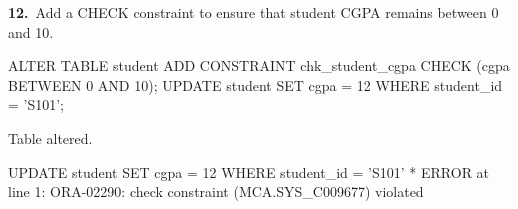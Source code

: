 
\noindent\begin{minipage}{\linewidth}
\begingroup{}
{\fontsize{14}{17}\selectfont\textbf{12.}}\ Add a CHECK constraint to ensure that student CGPA remains between 0 and 10.\par
\endgroup\vspace{12pt}


\begin{sqlcode}
ALTER TABLE student
    ADD CONSTRAINT chk_student_cgpa CHECK (cgpa BETWEEN 0 AND 10);
UPDATE student SET cgpa = 12 WHERE student_id = 'S101';
\end{sqlcode}

\vspace{18pt}


\begin{sqlout}
Table altered.

UPDATE student SET cgpa = 12 WHERE student_id = 'S101'
*
ERROR at line 1:
ORA-02290: check constraint (MCA.SYS_C009677) violated
\end{sqlout}
\end{minipage}\par\vspace{30pt}

